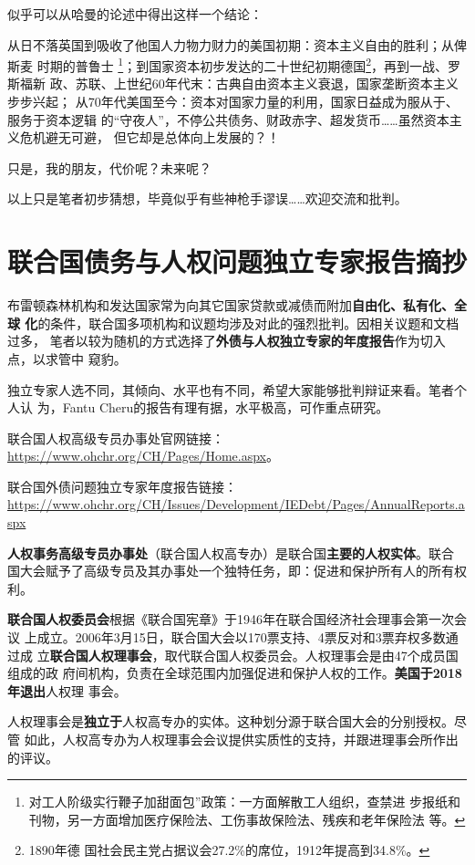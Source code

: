 似乎可以从哈曼的论述中得出这样一个结论：

从日不落英国到吸收了他国人力物力财力的美国初期：资本主义自由的胜利；从俾斯麦
时期的普鲁士 \footnote{对工人阶级实行鞭子加甜面包”政策：一方面解散工人组织，查禁进
  步报纸和刊物，另一方面增加医疗保险法、工伤事故保险法、残疾和老年保险法
  等。\cite[75]{zhuzhaiwenti}}；到国家资本初步发达的二十世纪初期德国\footnote{1890年德
  国社会民主党占据议会27.2\%的席位，1912年提高到34.8\%。}，再到一战、罗斯福新
政、苏联、上世纪60年代末：古典自由资本主义衰退，国家垄断资本主义步步兴起；
从70年代美国至今：资本对国家力量的利用，国家日益成为服从于、服务于资本逻辑
的“守夜人”，不停公共债务、财政赤字、超发货币……虽然资本主义危机避无可避，
但它却是总体向上发展的？！

只是，我的朋友，代价呢？未来呢？

以上只是笔者初步猜想，毕竟似乎有些神枪手谬误……欢迎交流和批判。


\section[联合国债务与人权独立专家报告]{联合国债务与人权问题独立专家报告摘抄}

布雷顿森林机构和发达国家常为向其它国家贷款或减债而附加\textbf{自由化、私有化、全球
  化}的条件，联合国多项机构和议题均涉及对此的强烈批判。因相关议题和文档过多，
笔者以较为随机的方式选择了\textbf{外债与人权独立专家的年度报告}作为切入点，以求管中
窥豹。

独立专家人选不同，其倾向、水平也有不同，希望大家能够批判辩证来看。笔者个人认
为，Fantu Cheru的报告有理有据，水平极高，可作重点研究。

联合国人权高级专员办事处官网链接：\url{https://www.ohchr.org/CH/Pages/Home.aspx}。

联合国外债问题独立专家年度报告链接：\url{https://www.ohchr.org/CH/Issues/Development/IEDebt/Pages/AnnualReports.aspx}


\textbf{人权事务高级专员办事处}（联合国人权高专办）是联合国\textbf{主要的人权实体}。联合
国大会赋予了高级专员及其办事处一个独特任务，即：促进和保护所有人的所有权利。

\textbf{联合国人权委员会}根据《联合国宪章》于1946年在联合国经济社会理事会第一次会议
上成立。2006年3月15日，联合国大会以170票支持、4票反对和3票弃权多数通过成
立\textbf{联合国人权理事会}，取代联合国人权委员会。人权理事会是由47个成员国组成的政
府间机构，负责在全球范围内加强促进和保护人权的工作。\textbf{美国于2018年退出}人权理
事会。

人权理事会是\textbf{独立于}人权高专办的实体。这种划分源于联合国大会的分别授权。尽管
如此，人权高专办为人权理事会会议提供实质性的支持，并跟进理事会所作出的评议。

